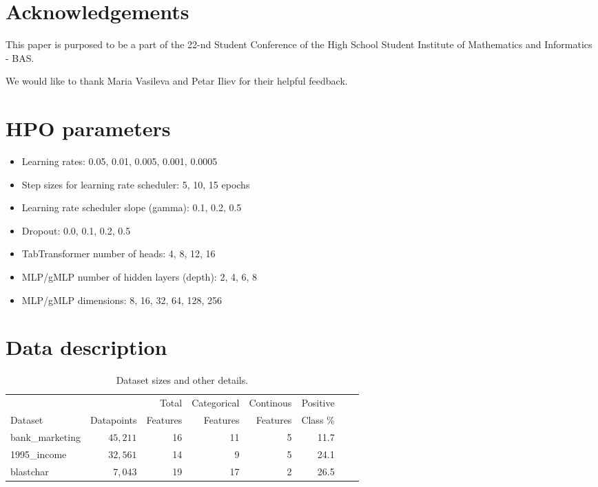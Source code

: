\documentclass{article}
\begin{document}
\section{Acknowledgements}

This paper is purposed to be a part of the 22-nd Student Conference of the High School Student Institute of Mathematics and Informatics - BAS.

We would like to thank Maria Vasileva and Petar Iliev for their helpful feedback.

\nocite{*}



\pagebreak

\appendix
\small
{}

\section{HPO parameters}
\label{appendix:hpo}

\begin{itemize}
    \item Learning rates: 0.05, 0.01, 0.005, 0.001, 0.0005
    \item Step sizes for learning rate scheduler: 5, 10, 15 epochs
    \item Learning rate scheduler slope (gamma): 0.1, 0.2, 0.5
    \item Dropout: 0.0, 0.1, 0.2, 0.5
    \item TabTransformer number of heads: 4, 8, 12, 16
    \item MLP/gMLP number of hidden layers (depth): 2, 4, 6, 8
    \item MLP/gMLP dimensions: 8, 16, 32, 64, 128, 256
\end{itemize}

\section{Data description}
\label{appendix:data}

\begin{table}[htp]
\caption{
	Dataset sizes and other details.
}
\label{tab:data-details}
\centering
	\begin{tabular}{lrrrrrrr}
		\toprule
		        &            & Total    & Categorical & Continous & Positive \\
		Dataset & Datapoints & Features & Features    & Features  & Class \% \\
		\midrule
		bank\_marketing  &   $45,211$ &       16 &    11 &    5 &     11.7 \\
		1995\_income     &   $32,561$ &       14 &     9 &     5 &     24.1 \\
		blastchar        &    $7,043$ &       19 &    17 &     2 &     26.5 \\
		\bottomrule
    \end{tabular}
\end{table}
\end{document}
